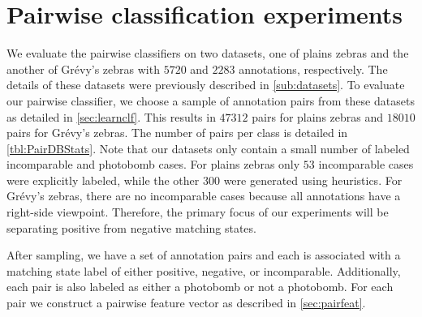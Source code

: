 \section{Pairwise classification experiments}\label{sec:pairexpt}


    We evaluate the pairwise classifiers on two datasets, one of plains zebras and the another of Grévy's zebras
      with $5720$ and $2283$ annotations, respectively.
    The details of these datasets were previously described in \cref{sub:datasets}.
    To evaluate our pairwise classifier, we choose a sample of annotation pairs from these datasets as detailed
      in \cref{sec:learnclf}.
    This results in $47312$ pairs for plains zebras and $18010$ pairs for Grévy's zebras.
    The number of pairs per class is detailed in \cref{tbl:PairDBStats}.
    Note that our datasets only contain a small number of labeled incomparable and photobomb cases.
    For plains zebras only $53$ incomparable cases were explicitly labeled, while the other $300$ were generated
      using heuristics.
    For Grévy's zebras, there are no incomparable cases because all annotations have a right-side viewpoint.
    Therefore, the primary focus of our experiments will be separating positive from negative matching states.

    \PairDBStats{}


    After sampling, we have a set of annotation pairs and each is associated with a \groundtruth{} matching state
      label of either positive, negative, or incomparable.
    Additionally, each pair is also labeled as either a photobomb or not a photobomb.
    For each pair we construct a pairwise feature vector as described in \cref{sec:pairfeat}.

